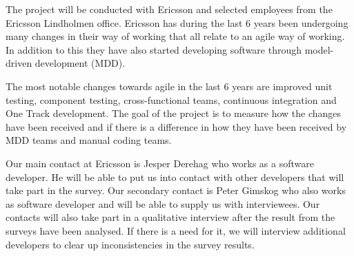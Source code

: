 \documentclass[ProjectPlan_innit.tex]{subfiles}
\begin{document}
The project will be conducted with Ericsson and selected employees from the Ericsson Lindholmen office. Ericsson has during the last 6 years been undergoing many changes in their way of working that all relate to an agile way of working. In addition to this they have also started developing software through model-driven development (MDD). 
\smallskip



The most notable changes towards agile in the last 6 years are improved unit testing\cite{UNIT:ENGELS:2007}, component testing\cite{COMP:}, cross-functional teams\cite{XFT:GHOBADI:2011}, continuous integration\cite{CI:ABDUL:2012} and One Track development\cite{ONETRACK:HRIBAR:2008}. The goal of the project is to measure how the changes have been received and if there is a difference in how they have been received by MDD teams and manual coding teams. 
\smallskip

Our main contact at Ericsson is Jesper Derehag who works as a software developer. He will be able to put us into contact with other developers that will take part in the survey. Our secondary contact is Peter Gimskog who also works as software developer and will be able to supply us with interviewees. Our contacts will also take part in a qualitative interview after the result from the surveys have been analysed. If there is a need for it, we will interview additional developers to clear up inconsistencies in the survey results. 
\end{document}
